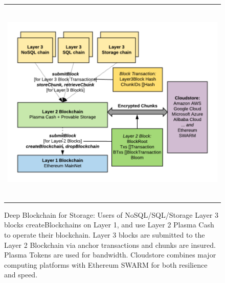 \documentclass{article}
\begin{document}
\begin{figure}[t]
\begin{tabular}{c}
\centerline{\includegraphics[height=10cm]{Deep-Blockchain.png}}
\end{tabular}
\caption{Deep Blockchain for Storage:  Users of NoSQL/SQL/Storage Layer 3 blocks createBlockchains on Layer 1, and use Layer 2 Plasma Cash to operate their blockchain.  Layer 3 blocks are submitted to the Layer 2 Blockchain via anchor transactions and chunks are insured.  Plasma Tokens are used for bandwidth.  Cloudstore combines major computing platforms with Ethereum SWARM for both resilience and speed.}
\centering
\label{deepblockchain}
\end{figure}
\end{document}
